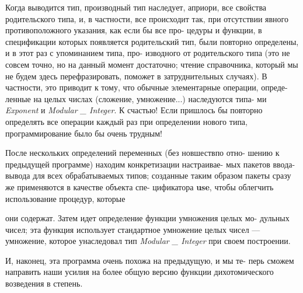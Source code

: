 Когда выводится тип, производный тип наследует, априори, все\linebreak
свойства родительского типа, и, в частности, все происходит так, при\linebreak
отсутствии явного противоположного указания, как если бы все про­-\linebreak
цедуры и функции, в спецификации которых появляется родительский\linebreak
тип, были повторно определены, и в этот раз с упоминанием типа, про­-\linebreak
изводного от родительского типа (это не совсем точно, но на данный\linebreak
момент достаточно; чтение справочника, который мы не будем здесь\linebreak
перефразировать, поможет в затруднительных случаях). В частности,\linebreak
это приводит к тому, что обычные элементарные операции, опреде­-\linebreak
ленные на целых числах (сложение, умножение...) наследуются типа­-\linebreak
ми {\it Exponent} и {\it Modular \_ Integer}. К счастью! Если пришлось бы повторно\linebreak
определять все операции каждый раз при определении нового типа,\linebreak
программирование было бы очень трудным!

После нескольких определений переменных (без новшествпо отно­-\linebreak
шению к предыдущей программе) находим конкретизации настраивае­-\linebreak
мых пакетов ввода-вывода для всех обрабатываемых типов; созданные\linebreak
таким образом пакеты сразу же применяются в качестве объекта спе­-\linebreak
цификатора {\bf use}, чтобы облегчить использование процедур, которые\linebreak

\newpage

\noindent они содержат. Затем идет определение функции умножения целых мо­-\linebreak
дульных чисел; эта функция использует стандартное умножение целых\linebreak
чисел — умножение, которое унаследовал тип {\it Modular \_ Integer} при своем\linebreak
построении.

И, наконец, эта программа очень похожа на предыдущую, и мы те­-\linebreak
перь сможем направить наши усилия на более общую версию функции\linebreak
дихотомического возведения в степень.

